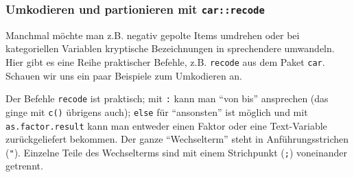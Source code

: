 \documentclass[12pt,ngerman,]{book}
\makeatletter
\newenvironment{Shaded}{\begin{snugshade}}{\end{snugshade}}
\newcommand{\KeywordTok}[1]{\textcolor[rgb]{0.13,0.29,0.53}{\textbf{{#1}}}}
\newcommand{\DataTypeTok}[1]{\textcolor[rgb]{0.13,0.29,0.53}{{#1}}}
\newcommand{\StringTok}[1]{\textcolor[rgb]{0.31,0.60,0.02}{{#1}}}
\newcommand{\CommentTok}[1]{\textcolor[rgb]{0.56,0.35,0.01}{\textit{{#1}}}}
\newcommand{\OtherTok}[1]{\textcolor[rgb]{0.56,0.35,0.01}{{#1}}}
\newcommand{\NormalTok}[1]{{#1}}
\newenvironment{kframe}{%
\medskip{}
\setlength{\fboxsep}{.8em}
 \def\at@end@of@kframe{}%
 \ifinner\ifhmode%
  \def\at@end@of@kframe{\end{minipage}}%
  \begin{minipage}{\columnwidth}%
 \fi\fi%
 \def\FrameCommand##1{\hskip\@totalleftmargin \hskip-\fboxsep
 \colorbox{shadecolor}{##1}\hskip-\fboxsep
     \hskip-\linewidth \hskip-\@totalleftmargin \hskip\columnwidth}%
 \MakeFramed {\advance\hsize-\width
   \@totalleftmargin\z@ \linewidth\hsize
   \@setminipage}}%
 {\par\unskip\endMakeFramed%
 \at@end@of@kframe}
\renewenvironment{Shaded}{\begin{kframe}}{\end{kframe}}
\makeatother
\begin{document}
\subsubsection{\texorpdfstring{Umkodieren und partionieren mit
\texttt{car::recode}}{Umkodieren und partionieren mit car::recode}}\label{umkodieren-und-partionieren-mit-carrecode}

Manchmal möchte man z.B. negativ gepolte Items umdrehen oder bei
kategoriellen Variablen kryptische Bezeichnungen in sprechendere
umwandeln. Hier gibt es eine Reihe praktischer Befehle, z.B.
\texttt{recode} aus dem Paket \texttt{car}. Schauen wir uns ein paar
Beispiele zum Umkodieren an.

\begin{Shaded}
\end{Shaded}

Der Befehle \texttt{recode} ist praktisch; mit \texttt{:} kann man ``von
bis'' ansprechen (das ginge mit \texttt{c()} übrigens auch);
\texttt{else} für ``ansonsten'' ist möglich und mit
\texttt{as.factor.result} kann man entweder einen Faktor oder eine
Text-Variable zurückgeliefert bekommen. Der ganze ``Wechselterm'' steht
in Anführungsstrichen (\texttt{"}). Einzelne Teile des Wechselterms sind
mit einem Strichpunkt (\texttt{;}) voneinander getrennt.
\end{document}
